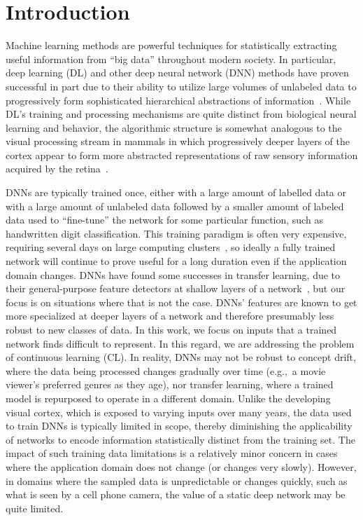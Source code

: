 \documentclass[10pt,conference]{IEEEtran}
\begin{document}
\section{Introduction}
Machine learning methods are powerful techniques for statistically extracting useful information from “big data” throughout modern society. In particular, deep learning (DL) and other deep neural network (DNN) methods have proven successful in part due to their ability to utilize large volumes of unlabeled data to progressively form sophisticated hierarchical abstractions of information~\cite{lecun2015deep,schmidhuber2015deep}. While DL's training and processing mechanisms are quite distinct from biological neural learning and behavior, the algorithmic structure is somewhat analogous to the visual processing stream in mammals in which progressively deeper layers of the cortex appear to form more abstracted representations of raw sensory information acquired by the retina~\cite{van1992information}.

DNNs are typically trained once, either with a large amount of labelled data or with a large amount of unlabeled data followed by a smaller amount of labeled data used to “fine-tune” the network for some particular function, such as handwritten digit classification. This training paradigm is often very expensive, requiring several days on large computing clusters~\cite{le2013building}, so ideally a fully trained network will continue to prove useful for a long duration even if the application domain changes. DNNs have found some successes in transfer learning, due to their general-purpose feature detectors at shallow layers of a network~\cite{cirecsan2012transfer, yosinski2014transferable}, but our focus is on situations where that is not the case. DNNs' features are known to get more specialized at deeper layers of a network and therefore presumably less robust to new classes of data. In this work, we focus on inputs that a trained network finds difficult to represent. In this regard, we are addressing the problem of continuous learning (CL). In reality, DNNs may not be robust to concept drift, where the data being processed changes gradually over time (e.g.,~a movie viewer's preferred genres as they age), nor transfer learning, where a trained model is repurposed to operate in a different domain. Unlike the developing visual cortex, which is exposed to varying inputs over many years, the data used to train DNNs is typically limited in scope, thereby diminishing the applicability of networks to encode information statistically distinct from the training set. The impact of such training data limitations is a relatively minor concern in cases where the application domain does not change (or changes very slowly). However, in domains where the sampled data is unpredictable or changes quickly, such as what is seen by a cell phone camera, the value of a static deep network may be quite limited. 
\end{document}
